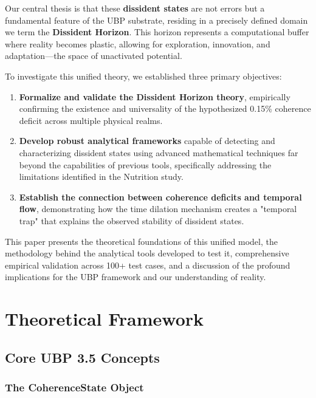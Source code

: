 \documentclass[12pt, a4paper]{article}
\begin{document}
Our central thesis is that these \textbf{dissident states} are not errors but a fundamental feature of the UBP substrate, residing in a precisely defined domain we term the \textbf{Dissident Horizon}. This horizon represents a computational buffer where reality becomes plastic, allowing for exploration, innovation, and adaptation—the space of unactivated potential.

To investigate this unified theory, we established three primary objectives:

\begin{enumerate}
    \item \textbf{Formalize and validate the Dissident Horizon theory}, empirically confirming the existence and universality of the hypothesized 0.15\% coherence deficit across multiple physical realms.
    
    \item \textbf{Develop robust analytical frameworks} capable of detecting and characterizing dissident states using advanced mathematical techniques far beyond the capabilities of previous tools, specifically addressing the limitations identified in the Nutrition study.
    
    \item \textbf{Establish the connection between coherence deficits and temporal flow}, demonstrating how the time dilation mechanism creates a "temporal trap" that explains the observed stability of dissident states.
\end{enumerate}

This paper presents the theoretical foundations of this unified model, the methodology behind the analytical tools developed to test it, comprehensive empirical validation across 100+ test cases, and a discussion of the profound implications for the UBP framework and our understanding of reality.

\section{Theoretical Framework}

\subsection{Core UBP 3.5 Concepts}

\subsubsection{The CoherenceState Object}
\end{document}
